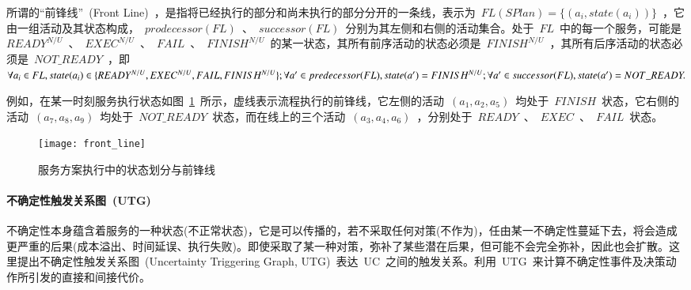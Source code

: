 所谓的“前锋线”~(Front Line)~，是指将已经执行的部分和尚未执行的部分分开的一条线，表示为~$FL(SPlan)=\{(a_i, state(a_i))\}$~，它由一组活动及其状态构成，~$prodecessor(FL)$~、~$successor(FL)$~分别为其左侧和右侧的活动集合。处于~$FL$~中的每一个服务，可能是~$READY^{N/U}$~、~$EXEC^{N/U}$~、~$FAIL$~、~$FINISH^{N/U}$~的某一状态，其所有前序活动的状态必须是~$FINISH^{N/U}$~，其所有后序活动的状态必须是~$NOT\_READY$~，即
$\forall {a_i} \in FL,state({a_i}) \in \{ READ{Y^{N/U}},{\rm{ }}EXE{C^{N/U}},{\rm{ }}FAIL,{\rm{ }}FINIS{H^{N/U}}\} ;\forall a' \in predecessor(FL),state(a') = FINIS{H^{N/U}};\forall a' \in successor(FL),state(a') = NOT\_READY.$

例如，在某一时刻服务执行状态如图~\ref{figure:front_line}~所示，虚线表示流程执行的前锋线，它左侧的活动~$(a_1, a_2, a_5)$~均处于~$FINISH$~状态，它右侧的活动~$(a_7, a_8, a_9)$~均处于~$NOT\_READY$~状态，而在线上的三个活动~$(a_3, a_4, a_6)$~，分别处于~$READY$~、~$EXEC$~、~$FAIL$~状态。

\begin{figure}[htbp]
    \centering
    \texttt{[image: front\_line]}
    \caption{服务方案执行中的状态划分与前锋线}\label{figure:front_line}
    \vspace{-1em}
\end{figure}


\paragraph{不确定性触发关系图~(UTG)~} 
不确定性本身蕴含着服务的一种状态(不正常状态)，它是可以传播的，若不采取任何对策(不作为)，任由某一不确定性蔓延下去，将会造成更严重的后果(成本溢出、时间延误、执行失败)。即使采取了某一种对策，弥补了某些潜在后果，但可能不会完全弥补，因此也会扩散。这里提出不确定性触发关系图~(Uncertainty Triggering Graph, UTG)~表达~UC~之间的触发关系。利用~UTG~来计算不确定性事件及决策动作所引发的直接和间接代价。

